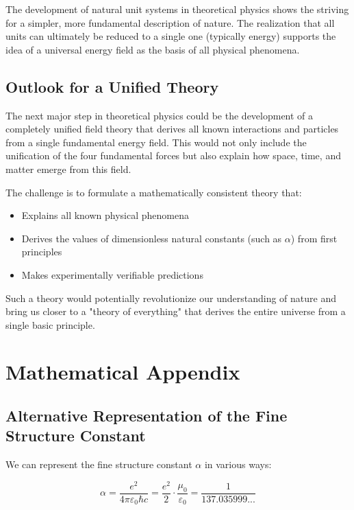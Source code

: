 \documentclass{article}
\begin{document}
The development of natural unit systems in theoretical physics shows the striving for a simpler, more fundamental description of nature. The realization that all units can ultimately be reduced to a single one (typically energy) supports the idea of a universal energy field as the basis of all physical phenomena.

\subsection{Outlook for a Unified Theory}

The next major step in theoretical physics could be the development of a completely unified field theory that derives all known interactions and particles from a single fundamental energy field. This would not only include the unification of the four fundamental forces but also explain how space, time, and matter emerge from this field.

The challenge is to formulate a mathematically consistent theory that:

\begin{itemize}
	\item Explains all known physical phenomena
	\item Derives the values of dimensionless natural constants (such as $\alpha$) from first principles
	\item Makes experimentally verifiable predictions
\end{itemize}

Such a theory would potentially revolutionize our understanding of nature and bring us closer to a "theory of everything" that derives the entire universe from a single basic principle.

\section{Mathematical Appendix}

\subsection{Alternative Representation of the Fine Structure Constant}

We can represent the fine structure constant $\alpha$ in various ways:

\begin{equation}
	\alpha = \frac{e^2}{4\pi\varepsilon_0\hbar c} = \frac{e^2}{2} \cdot \frac{\mu_0}{\varepsilon_0} = \frac{1}{137.035999...}
\end{equation}
\end{document}
